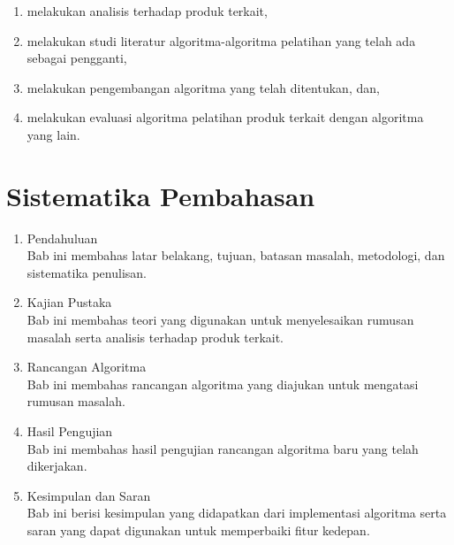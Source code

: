 \begin{enumerate}
	\item melakukan analisis terhadap produk terkait,
	\item melakukan studi literatur algoritma-algoritma pelatihan yang telah ada sebagai pengganti,
	\item melakukan pengembangan algoritma yang telah ditentukan, dan,
	\item melakukan evaluasi algoritma pelatihan produk terkait dengan algoritma yang lain. 
\end{enumerate}

\section{Sistematika Pembahasan}

\begin{enumerate}[label=Bab \arabic*,itemindent=*]
	\item Pendahuluan\\
	Bab ini membahas latar belakang, tujuan, batasan masalah, metodologi, dan sistematika penulisan.
	\item Kajian Pustaka\\
	Bab ini membahas teori yang digunakan untuk menyelesaikan rumusan masalah serta analisis terhadap produk terkait.
	\item Rancangan Algoritma\\
	Bab ini membahas rancangan algoritma yang diajukan untuk mengatasi rumusan masalah.
	\item Hasil Pengujian\\
	Bab ini membahas hasil pengujian rancangan algoritma baru yang telah dikerjakan.
	\item Kesimpulan dan Saran\\
	Bab ini berisi kesimpulan yang didapatkan dari implementasi algoritma serta saran yang dapat digunakan untuk memperbaiki fitur kedepan.
\end{enumerate}
